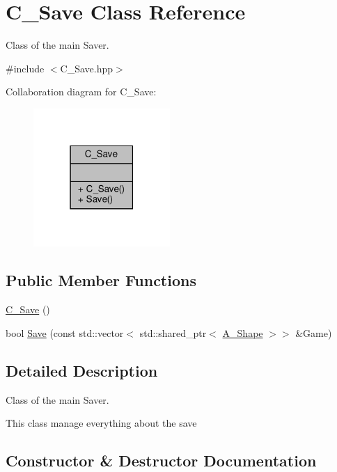 \hypertarget{classC__Save}{}\section{C\+\_\+\+Save Class Reference}
\label{classC__Save}


Class of the main Saver.  




{\ttfamily \#include $<$C\+\_\+\+Save.\+hpp$>$}



Collaboration diagram for C\+\_\+\+Save\+:\nopagebreak
\begin{figure}[H]
\begin{center}
\leavevmode
\includegraphics[width=147pt]{classC__Save__coll__graph}
\end{center}
\end{figure}
\subsection*{Public Member Functions}
\begin{DoxyCompactItemize}
\item 
\hyperlink{classC__Save_adc49f753d7b0f40c95ec2b93f81b9672}{C\+\_\+\+Save} ()
\item 
bool \hyperlink{classC__Save_a144be848679b771afb9cf410710308e8}{Save} (const std\+::vector$<$ std\+::shared\+\_\+ptr$<$ \hyperlink{classA__Shape}{A\+\_\+\+Shape} $>$$>$ \&Game)
\end{DoxyCompactItemize}


\subsection{Detailed Description}
Class of the main Saver. 

This class manage everything about the save 

\subsection{Constructor \& Destructor Documentation}
\mbox{\label{classC__Save_adc49f753d7b0f40c95ec2b93f81b9672}} 
